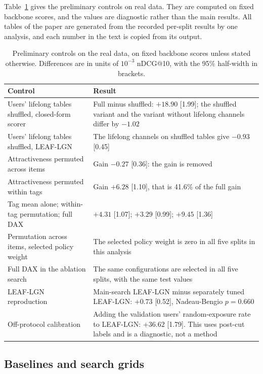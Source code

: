 \documentclass[preprint,12pt,authoryear]{elsarticle}
\begin{document}
Table~\ref{tab:controls-real} gives the preliminary controls on real data. They are computed on fixed backbone scores, and the values are diagnostic rather than
the main results. All tables of the paper are generated from the recorded per-split results by one analysis, and each number in the text is copied from its output.

\begin{table}[tbp]
\centering
\caption{Preliminary controls on the real data, on fixed backbone scores unless stated otherwise. Differences are in units of $10^{-3}$ nDCG@10, with the 95\% half-width in brackets.}
\label{tab:controls-real}
\footnotesize
\renewcommand{\arraystretch}{1.1}
\begin{tabular}{p{}p{}}
\toprule
Control & Result \\
\midrule
Users' lifelong tables shuffled, closed-form scorer & Full minus shuffled: $+18.90$ [1.99]; the shuffled variant and the variant without lifelong channels differ by $-1.02$ \\
Users' lifelong tables shuffled, LEAF-LGN & The lifelong channels on shuffled tables give $-0.93$ [0.45] \\
Attractiveness permuted across items & Gain $-0.27$ [0.36]: the gain is removed \\
Attractiveness permuted within tags & Gain $+6.28$ [1.10], that is 41.6\% of the full gain \\
Tag mean alone; within-tag permutation; full DAX & $+4.31$ [1.07]; $+3.29$ [0.99]; $+9.45$ [1.36] \\
Permutation across items, selected policy weight & The selected policy weight is zero in all five splits in this analysis \\
Full DAX in the ablation search & The same configurations are selected in all five splits, with the same test values \\
LEAF-LGN reproduction & Main-search LEAF-LGN minus separately tuned LEAF-LGN: $+0.73$ [0.52], Nadeau-Bengio $p=0.660$ \\
Off-protocol calibration & Adding the validation users' random-exposure rate to LEAF-LGN: $+36.62$ [1.79]. This uses post-cut labels and is a diagnostic, not a method \\
\bottomrule
\end{tabular}
\end{table}

\subsection{Baselines and search grids}\label{app:baselines}
\end{document}
